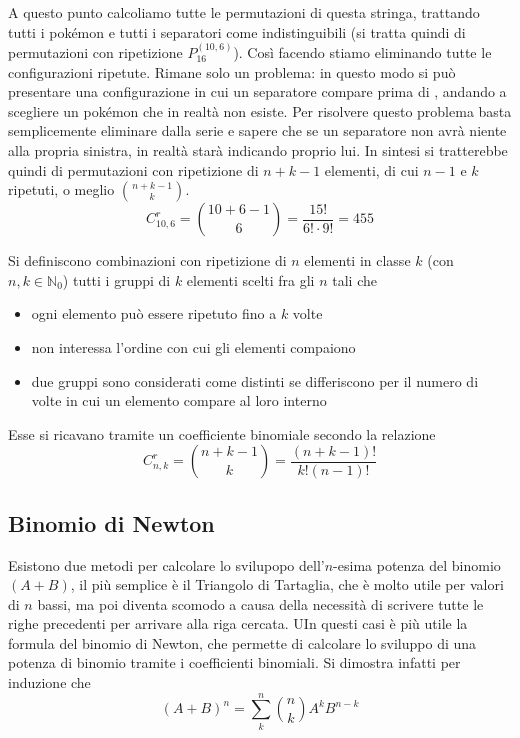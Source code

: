 \documentclass{article}     %
\begin{document}
\begin{ex}
            A questo punto calcoliamo tutte le permutazioni di questa stringa, trattando tutti i pokémon e tutti i separatori come indistinguibili (si tratta quindi di permutazioni con ripetizione $P_{16}^{(10,6)}$). Così facendo stiamo eliminando tutte le configurazioni ripetute. Rimane solo un problema: in questo modo si può presentare una configurazione in cui un separatore compare prima di , andando a scegliere un pokémon che in realtà non esiste. Per risolvere questo problema basta semplicemente eliminare  dalla serie e sapere che se un separatore non avrà niente alla propria sinistra, in realtà starà indicando proprio lui. In sintesi si tratterebbe quindi di permutazioni con ripetizione di $n+k-1$ elementi, di cui $n-1$ e $k$ ripetuti, o meglio $\binom{n+k-1}{k}$.
            \[C^r_{10,6}=\binom{10+6-1}{6}=\frac{15!}{6!\cdot9!}=455\]
        \end{ex} 
            \begin{boxdef}  
                Si definiscono combinazioni con ripetizione di $n$ elementi in classe $k$ (con $n,k\in \mathbb{N}_0$) tutti i gruppi di $k$ elementi scelti fra gli $n$ tali che 
                \begin{itemize}
                    \item ogni elemento può essere ripetuto fino a $k$ volte
                    \item non interessa l'ordine con cui gli elementi compaiono
                    \item due gruppi sono considerati come distinti se differiscono per il numero di volte in cui un elemento compare al loro interno
                \end{itemize}
            \end{boxdef}
            Esse si ricavano tramite un coefficiente binomiale secondo la relazione \[C_{n,k}^r=\binom{n+k-1}{k}=\frac{(n+k-1)!}{k!(n-1)!}\]

        \subsection{Binomio di Newton}
            Esistono due metodi per calcolare lo svilupopo dell'$n$-esima potenza del binomio $(A+B)$, il più semplice è il Triangolo di Tartaglia, che è molto utile per valori di $n$ bassi, ma poi diventa scomodo a causa della necessità di scrivere tutte le righe precedenti per arrivare alla riga cercata. UIn questi casi è più utile la formula del binomio di Newton, che permette di calcolare lo sviluppo di una potenza di binomio tramite i coefficienti binomiali. Si dimostra infatti per induzione che 
            \[(A+B)^n=\sum_k^n\binom{n}{k}A^kB^{n-k}\]
\end{document}
